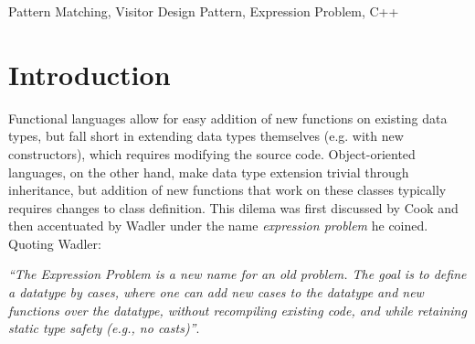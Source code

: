 \documentclass[preprint]{sigplanconf}
\begin{document}
\keywords
Pattern Matching, Visitor Design Pattern, Expression Problem, C++

\section{Introduction} %
\label{sec:intro}





Functional languages allow for easy addition of new functions on existing data 
types, but fall short in extending data types themselves (e.g. with new constructors), 
which requires modifying the source code. Object-oriented languages, on the 
other hand, make data type extension trivial through inheritance, but addition 
of new functions that work on these classes typically requires changes to class 
definition. This dilema was first discussed by Cook\cite{Cook90} and then 
accentuated by Wadler\cite{exprproblem} under the name \emph{expression problem} 
he coined. Quoting Wadler:

\emph{``The Expression Problem is a new name for an old problem. The goal is
to define a datatype by cases, where one can add new cases to the
datatype and new functions over the datatype, without recompiling
existing code, and while retaining static type safety (e.g., no
casts)''}.
\end{document}
